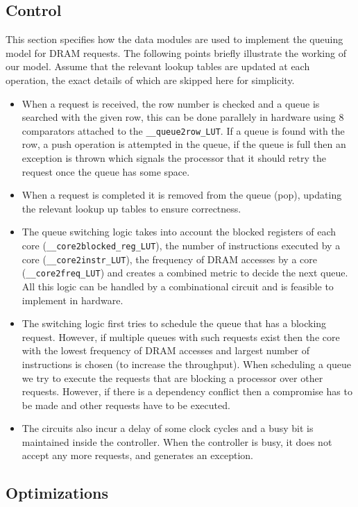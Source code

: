 \documentclass[hidelinks,12pt]{article}
\begin{document}
\subsection{Control}
This section specifies how the data modules are used to implement the queuing model for DRAM requests.
The following points briefly illustrate the working of our model. Assume that the relevant lookup tables are updated
at each operation, the exact details of which are skipped here for simplicity.
\begin{itemize}
    \item When a request is received, the row number is checked and a queue is searched with the given row, this can be done parallely in hardware using
          8 comparators attached to the \verb|__queue2row_LUT|. If a queue is found with the row, a push operation is attempted in the queue, if the queue is full then
          an exception is thrown which signals the processor that it should retry the request once the queue has some space.
    \item When a request is completed it is removed from the queue (pop), updating the relevant lookup up tables to ensure correctness.
    \item The queue switching logic takes into account the blocked registers of each core (\verb|__core2blocked_reg_LUT|), the number of instructions executed by a core (\verb|__core2instr_LUT|), the frequency of DRAM accesses by a core (\verb|__core2freq_LUT|)
          and creates a combined metric to decide the next queue. All this logic can be handled by a combinational circuit and is feasible to implement in hardware.
    \item The switching logic first tries to schedule the queue that has a blocking request. However, if multiple queues with such requests exist then the core with the lowest frequency of DRAM accesses and largest number of instructions is chosen (to increase the throughput).
          When scheduling a queue we try to execute the requests that are blocking a processor over other requests. However, if there is a dependency conflict then a compromise has to be made and other requests have to be executed.
    \item The circuits also incur a delay of some clock cycles and a busy bit is maintained inside the controller. When the controller is busy, it does not accept any more requests, and generates an exception.
\end{itemize}
\newpage
\subsection{Optimizations}
\end{document}
